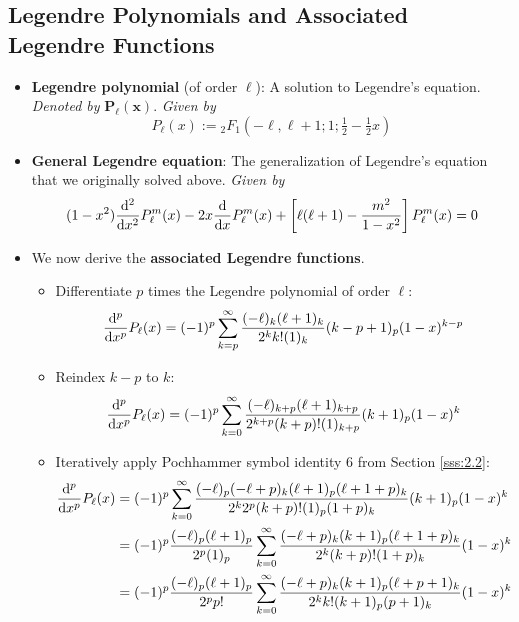 \documentclass[../finalProject.tex]{subfiles}
\begin{document}
\subsection{Legendre Polynomials and Associated Legendre Functions}\label{sss:5.3}
\begin{itemize}
    \item \textbf{Legendre polynomial} (of order $\ell$): A solution to Legendre's equation. \emph{Denoted by} $\bm{P_\ell(x)}$. \emph{Given by}
    \begin{equation*}
        P_\ell(x) := {}_2F_1(-\ell,\ell+1;1;\tfrac{1}{2}-\tfrac{1}{2}x)
    \end{equation*}
    \item \textbf{General Legendre equation}: The generalization of Legendre's equation that we originally solved above. \emph{Given by}
    \begin{equation*}
        (1-x^2)\dv[2]{x}P_\ell^m(x)-2x\dv{x}P_\ell^m(x)+\left[ \ell(\ell+1)-\frac{m^2}{1-x^2} \right]P_\ell^m(x) = 0
    \end{equation*}
    \item We now derive the \textbf{associated Legendre functions}.
    \begin{itemize}
        \item Differentiate $p$ times the Legendre polynomial of order $\ell$:
        \begin{equation*}
            \dv[p]{x}P_\ell(x) = (-1)^p\sum_{k=p}^\infty\frac{(-\ell)_k(\ell+1)_k}{2^kk!(1)_k}(k-p+1)_p(1-x)^{k-p}
        \end{equation*}
        \item Reindex $k-p$ to $k$:
        \begin{equation*}
            \dv[p]{x}P_\ell(x) = (-1)^p\sum_{k=0}^\infty\frac{(-\ell)_{k+p}(\ell+1)_{k+p}}{2^{k+p}(k+p)!(1)_{k+p}}(k+1)_p(1-x)^k
        \end{equation*}
        \item Iteratively apply Pochhammer symbol identity 6 from Section \ref{sss:2.2}:
        \begin{align*}
            \dv[p]{x}P_\ell(x) &= (-1)^p\sum_{k=0}^\infty\frac{(-\ell)_p(-\ell+p)_k(\ell+1)_p(\ell+1+p)_k}{2^k2^p(k+p)!(1)_p(1+p)_k}(k+1)_p(1-x)^k\\
            &= (-1)^p\frac{(-\ell)_p(\ell+1)_p}{2^p(1)_p}\sum_{k=0}^\infty\frac{(-\ell+p)_k(k+1)_p(\ell+1+p)_k}{2^k(k+p)!(1+p)_k}(1-x)^k\\
            &= (-1)^p\frac{(-\ell)_p(\ell+1)_p}{2^pp!}\sum_{k=0}^\infty\frac{(-\ell+p)_k(k+1)_p(\ell+p+1)_k}{2^kk!(k+1)_p(p+1)_k}(1-x)^k\\

\end{align*}
\end{itemize}
\end{itemize}
\end{document}
